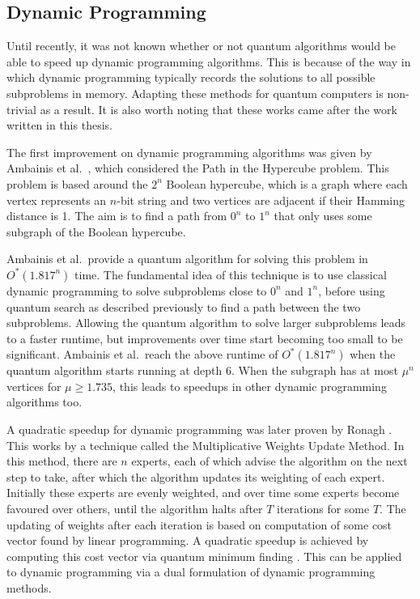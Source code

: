 \subsection{Dynamic Programming}
\label{ssec:q-dynamic}

Until recently, it was not known whether or not quantum algorithms would be able to speed up dynamic programming algorithms. This is because of the way in which dynamic programming typically records the solutions to all possible subproblems in memory. Adapting these methods for quantum computers is non-trivial as a result. It is also worth noting that these works came after the work written in this thesis.

The first improvement on dynamic programming algorithms was given by Ambainis et al.\ \cite{ambainis2018}, which considered the Path in the Hypercube problem. This problem is based around the $2^n$ Boolean hypercube, which is a graph where each vertex represents an $n$-bit string and two vertices are adjacent if their Hamming distance is 1. The aim is to find a path from $0^n$ to $1^n$ that only uses some subgraph of the Boolean hypercube.

Ambainis et al.\ provide a quantum algorithm for solving this problem in $O^*(1.817^n)$ time. The fundamental idea of this technique is to use classical dynamic programming to solve subproblems close to $0^n$ and $1^n$, before using quantum search as described previously to find a path between the two subproblems. Allowing the quantum algorithm to solve larger subproblems leads to a faster runtime, but improvements over time start becoming too small to be significant. Ambainis et al.\ reach the above runtime of $O^*(1.817^n)$ when the quantum algorithm starts running at depth $6$. When the subgraph has at most $\mu^n$ vertices for $\mu \geq 1.735$, this leads to speedups in other dynamic programming algorithms too.

A quadratic speedup for dynamic programming was later proven by Ronagh \cite{ronagh2019}. This works by a technique called the Multiplicative Weights Update Method. In this method, there are $n$ experts, each of which advise the algorithm on the next step to take, after which the algorithm updates its weighting of each expert. Initially these experts are evenly weighted, and over time some experts become favoured over others, until the algorithm halts after $T$ iterations for some $T$. The updating of weights after each iteration is based on computation of some cost vector found by linear programming. A quadratic speedup is achieved by computing this cost vector via quantum minimum finding \cite{durr1996}. This can be applied to dynamic programming via a dual formulation of dynamic programming methods.


